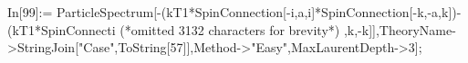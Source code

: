 In[99]:= ParticleSpectrum[-(kT1*SpinConnection[-i,a,i]*SpinConnection[-k,-a,k])-(kT1*SpinConnecti (*omitted 3132 characters for brevity*) ,k,-k]],TheoryName->StringJoin["Case",ToString[57]],Method->"Easy",MaxLaurentDepth->3];